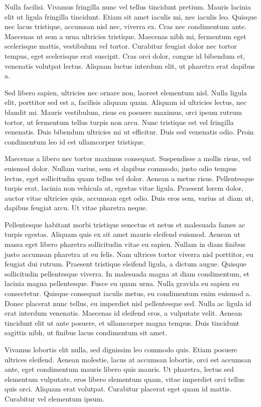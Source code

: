 Nulla facilisi. Vivamus fringilla nunc vel tellus tincidunt pretium. Mauris lacinia elit ut ligula fringilla tincidunt. Etiam sit amet iaculis mi, nec iaculis leo. Quisque nec lacus tristique, accumsan nisl nec, viverra ex. Cras nec condimentum ante. Maecenas ut sem a urna ultricies tristique. Maecenas nibh mi, fermentum eget scelerisque mattis, vestibulum vel tortor. Curabitur feugiat dolor nec tortor tempus, eget scelerisque erat suscipit. Cras orci dolor, congue id bibendum et, venenatis volutpat lectus. Aliquam luctus interdum elit, ut pharetra erat dapibus a.

Sed libero sapien, ultricies nec ornare non, laoreet elementum nisl. Nulla ligula elit, porttitor sed est a, facilisis aliquam quam. Aliquam id ultricies lectus, nec blandit mi. Mauris vestibulum, risus eu posuere maximus, orci ipsum rutrum tortor, ut fermentum tellus turpis non arcu. Nunc tristique est vel fringilla venenatis. Duis bibendum ultricies mi ut efficitur. Duis sed venenatis odio. Proin condimentum leo id est ullamcorper tristique.

Maecenas a libero nec tortor maximus consequat. Suspendisse a mollis risus, vel euismod dolor. Nullam varius, sem et dapibus commodo, justo odio tempus lectus, eget sollicitudin quam tellus vel dolor. Aenean a metus risus. Pellentesque turpis erat, lacinia non vehicula at, egestas vitae ligula. Praesent lorem dolor, auctor vitae ultricies quis, accumsan eget odio. Duis eros sem, varius at diam ut, dapibus feugiat arcu. Ut vitae pharetra neque.

Pellentesque habitant morbi tristique senectus et netus et malesuada fames ac turpis egestas. Aliquam quis ex sit amet mauris eleifend euismod. Aenean ut massa eget libero pharetra sollicitudin vitae eu sapien. Nullam in diam finibus justo accumsan pharetra at eu felis. Nam ultrices tortor viverra nisl porttitor, eu feugiat dui rutrum. Praesent tristique eleifend ligula, a dictum augue. Quisque sollicitudin pellentesque viverra. In malesuada magna at diam condimentum, et lacinia magna pellentesque. Fusce eu quam urna. Nulla gravida eu sapien eu consectetur. Quisque consequat iaculis metus, eu condimentum enim euismod a. Donec placerat nunc tellus, eu imperdiet nisl pellentesque sed. Nulla ac ligula id erat interdum venenatis. Maecenas id eleifend eros, a vulputate velit. Aenean tincidunt elit ut ante posuere, et ullamcorper magna tempus. Duis tincidunt sagittis nibh, ut finibus lacus condimentum sit amet.

Vivamus lobortis elit nulla, sed dignissim leo commodo quis. Etiam posuere ultrices eleifend. Aenean molestie, lacus at accumsan lobortis, orci est accumsan ante, eget condimentum mauris libero quis mauris. Ut pharetra, lectus sed elementum vulputate, eros libero elementum quam, vitae imperdiet orci tellus quis orci. Aliquam erat volutpat. Curabitur placerat eget quam id mattis. Curabitur vel elementum ipsum.

